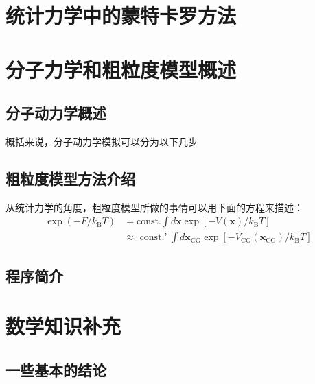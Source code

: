 \documentclass[AutoFakeBold]{tstextbook}
\begin{document}
\chapter{统计力学中的蒙特卡罗方法} %
\label{cha:统计力学中的蒙特卡罗方法}

\chapter{分子力学和粗粒度模型概述} %
\label{cha:分子力学模拟和粗粒度模型概述}
\section{分子动力学概述} %
\label{sec:分子动力学概述}
概括来说，分子动力学模拟可以分为以下几步
\section{粗粒度模型方法介绍} %
\label{sec:粗粒度模型方法介绍}
从统计力学的角度，粗粒度模型所做的事情可以用下面的方程来描述：
\begin{equation}
    \begin{aligned}
        \exp \left(-F / k_{\mathrm{B}} T\right) & =\text{const.} \int d \mathbf{x} \exp \left[-V(\mathbf{x}) / k_{\mathrm{B}} T\right]\\
        & \approx\text { const.' }\int d \mathbf{x}_{\mathrm{CG}} \exp \left[-V_{\mathrm{CG}}\left(\mathbf{x}_{\mathrm{CG}}\right) / k_{\mathrm{B}} T\right]
    \end{aligned}
\end{equation}



\section{程序简介} %
\label{sec:程序简介}

\appendix
\chapter{数学知识补充} %
\label{cha:数学知识补充}
\section{一些基本的结论} %
\label{sec:一些基本的结论}
\end{document}
